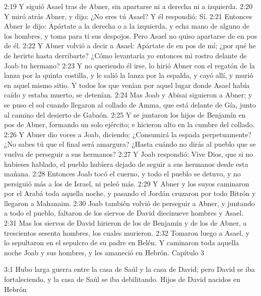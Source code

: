 2:19 Y siguió Asael tras de Abner, sin apartarse ni a derecha ni a izquierda.  
2:20 Y miró atrás Abner, y dijo: ¿No eres tú Asael? Y él respondió: Sí.  
2:21 Entonces Abner le dijo: Apártate a la derecha o a la izquierda, y echa mano de alguno de los hombres, y toma para ti sus despojos. Pero Asael no quiso apartarse de en pos de él.  
2:22 Y Abner volvió a decir a Asael: Apártate de en pos de mí; ¿por qué he de herirte hasta derribarte? ¿Cómo levantaría yo entonces mi rostro delante de Joab tu hermano?  
2:23 Y no queriendo él irse, lo hirió Abner con el regatón de la lanza por la quinta costilla, y le salió la lanza por la espalda, y cayó allí, y murió en aquel mismo sitio. Y todos los que venían por aquel lugar donde Asael había caído y estaba muerto, se detenían.  
2:24 Mas Joab y Abisai siguieron a Abner; y se puso el sol cuando llegaron al collado de Amma, que está delante de Gía, junto al camino del desierto de Gabaón.  
2:25 Y se juntaron los hijos de Benjamín en pos de Abner, formando un solo ejército; e hicieron alto en la cumbre del collado.  
2:26 Y Abner dio voces a Joab, diciendo: ¿Consumirá la espada perpetuamente? ¿No sabes tú que el final será amargura? ¿Hasta cuándo no dirás al pueblo que se vuelva de perseguir a sus hermanos?  
2:27 Y Joab respondió: Vive Dios, que si no hubieses hablado, el pueblo hubiera dejado de seguir a sus hermanos desde esta mañana.  
2:28 Entonces Joab tocó el cuerno, y todo el pueblo se detuvo, y no persiguió más a los de Israel, ni peleó más.  
2:29 Y Abner y los suyos caminaron por el Arabá toda aquella noche, y pasando el Jordán cruzaron por todo Bitrón y llegaron a Mahanaim.  
2:30 Joab también volvió de perseguir a Abner, y juntando a todo el pueblo, faltaron de los siervos de David diecinueve hombres y Asael.  
2:31 Mas los siervos de David hirieron de los de Benjamín y de los de Abner, a trescientos sesenta hombres, los cuales murieron.  
2:32 Tomaron luego a Asael, y lo sepultaron en el sepulcro de su padre en Belén. Y caminaron toda aquella noche Joab y sus hombres, y les amaneció en Hebrón. 
Capítulo 3 

3:1 Hubo larga guerra entre la casa de Saúl y la casa de David; pero David se iba fortaleciendo, y la casa de Saúl se iba debilitando.  
Hijos de David nacidos en Hebrón  
 
